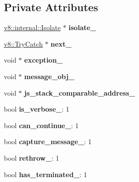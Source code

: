 \subsection*{Private Attributes}
\begin{DoxyCompactItemize}
\item 
\hyperlink{classv8_1_1internal_1_1_isolate}{v8\+::internal\+::\+Isolate} $\ast$ {\bfseries isolate\+\_\+}\hypertarget{classv8_1_1_try_catch_a41cd5bd5fd37c48d6e0392f769a789d5}{}\label{classv8_1_1_try_catch_a41cd5bd5fd37c48d6e0392f769a789d5}

\item 
\hyperlink{classv8_1_1_try_catch}{v8\+::\+Try\+Catch} $\ast$ {\bfseries next\+\_\+}\hypertarget{classv8_1_1_try_catch_a2e9b54b01f7f97f42af5b7b377918334}{}\label{classv8_1_1_try_catch_a2e9b54b01f7f97f42af5b7b377918334}

\item 
void $\ast$ {\bfseries exception\+\_\+}\hypertarget{classv8_1_1_try_catch_a4ae6a166af0336716516addc1f64fe1f}{}\label{classv8_1_1_try_catch_a4ae6a166af0336716516addc1f64fe1f}

\item 
void $\ast$ {\bfseries message\+\_\+obj\+\_\+}\hypertarget{classv8_1_1_try_catch_a6efc81ccc783f40c660f0e709b578aaa}{}\label{classv8_1_1_try_catch_a6efc81ccc783f40c660f0e709b578aaa}

\item 
void $\ast$ {\bfseries js\+\_\+stack\+\_\+comparable\+\_\+address\+\_\+}\hypertarget{classv8_1_1_try_catch_a0f685aca812478ad996fabac7c291e89}{}\label{classv8_1_1_try_catch_a0f685aca812478ad996fabac7c291e89}

\item 
bool {\bfseries is\+\_\+verbose\+\_\+}\+: 1\hypertarget{classv8_1_1_try_catch_a3c2798d8716a14df4550bfadefdcf6a7}{}\label{classv8_1_1_try_catch_a3c2798d8716a14df4550bfadefdcf6a7}

\item 
bool {\bfseries can\+\_\+continue\+\_\+}\+: 1\hypertarget{classv8_1_1_try_catch_a92c1bd92eecbc728d6c2150c338fef7d}{}\label{classv8_1_1_try_catch_a92c1bd92eecbc728d6c2150c338fef7d}

\item 
bool {\bfseries capture\+\_\+message\+\_\+}\+: 1\hypertarget{classv8_1_1_try_catch_ad1f5b0368678fa2bd0d73ac17acf976e}{}\label{classv8_1_1_try_catch_ad1f5b0368678fa2bd0d73ac17acf976e}

\item 
bool {\bfseries rethrow\+\_\+}\+: 1\hypertarget{classv8_1_1_try_catch_a6c8efeb878409539d0863314fba98a23}{}\label{classv8_1_1_try_catch_a6c8efeb878409539d0863314fba98a23}

\item 
bool {\bfseries has\+\_\+terminated\+\_\+}\+: 1\hypertarget{classv8_1_1_try_catch_a00a16327470f47613764b652b15d0f71}{}\label{classv8_1_1_try_catch_a00a16327470f47613764b652b15d0f71}

\end{DoxyCompactItemize}
